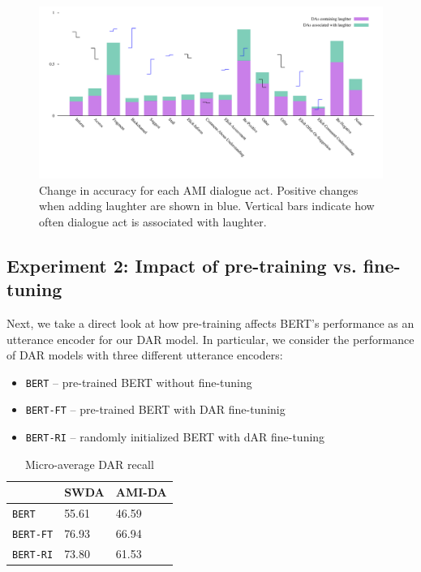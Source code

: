 \documentclass[11pt,a4paper]{article}
\begin{document}
\begin{figure}
  \centering
  \includegraphics[width=\textwidth]{img/AMI-DA-bertLvsNL.pdf}
  \caption{Change in accuracy for each AMI dialogue act. Positive changes when adding laughter are shown in blue. Vertical bars indicate how often dialogue act is associated with laughter.}
\end{figure}

\subsection{Experiment 2: Impact of pre-training vs. fine-tuning} \label{sec:experiment2} %
Next, we take a direct look at how pre-training affects BERT's performance as an utterance encoder for our DAR model.
In particular, we consider the performance of DAR models with three different utterance encoders:
\begin{itemize}
  \item \texttt{BERT} -- pre-trained BERT without fine-tuning 
  \item \texttt{BERT-FT} -- pre-trained BERT with DAR fine-tuninig 
  \item \texttt{BERT-RI} -- randomly initialized BERT with dAR fine-tuning 
\end{itemize}

\begin{table}[]
\centering 
\begin{tabular}{@{}lll@{}}
\toprule
                 & SWDA  & AMI-DA \\ \midrule
\texttt{BERT}       & 55.61 & 46.59  \\
\texttt{BERT-FT}    & 76.93 & 66.94  \\
\texttt{BERT-RI}    & 73.80 & 61.53  
\end{tabular}
  \caption{Micro-average DAR recall}
  \label{table:exp2-avg}
\end{table}    
\end{document}
